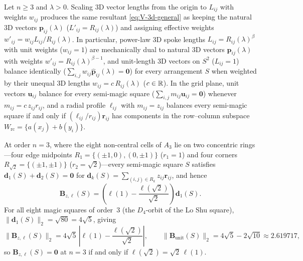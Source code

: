 \begin{proposition}
\label{prop:reciprocity}
Let $n\ge3$ and $\lambda>0$. Scaling 3D vector lengths from the origin to $L_{ij}$ with weights $w_{ij}$ produces the same resultant \eqref{eq:V-3d-general} as keeping the natural 3D vectors $\mathbf p_{ij}(\lambda)$ ($L'_{ij}=R_{ij}(\lambda)$) and assigning effective weights $w'_{ij}=w_{ij}L_{ij}/R_{ij}(\lambda)$. In particular, power-law 3D spoke lengths $L_{ij}=R_{ij}(\lambda)^\beta$ with unit weights ($w_{ij}=1$) are mechanically dual to natural 3D vectors $\mathbf p_{ij}(\lambda)$ with weights $w'_{ij}=R_{ij}(\lambda)^{\beta-1}$, and unit-length 3D vectors on $S^2$ ($L_{ij}=1$) balance identically ($\sum_{i,j}w_{ij}\hat{\mathbf p}_{ij}(\lambda)=\mathbf 0$) for every arrangement $S$ when weighted by their unequal 3D lengths $w_{ij}=c\,R_{ij}(\lambda)$ ($c\in\mathbb{R}$). In the grid plane, unit vectors $\mathbf u_{ij}$ balance for every semi-magic square ($\sum_{i,j}m_{ij}\mathbf u_{ij}=\mathbf 0$) whenever $m_{ij}=c\,z_{ij}r_{ij}$, and a radial profile $\ell_{ij}$ with $m_{ij}=z_{ij}$ balances every semi-magic square if and only if $(\ell_{ij}/r_{ij})\mathbf r_{ij}$ has components in the row--column subspace $W_{\mathrm{rc}}=\{a(x_j)+b(y_i)\}$.

At order $n=3$, where the eight non-central cells of $A_3$ lie on two concentric rings—four edge midpoints $R_1=\{(\pm1,0),(0,\pm1)\}$ ($r_1=1$) and four corners $R_{\sqrt{2}}=\{(\pm1,\pm1)\}$ ($r_2=\sqrt{2}$)—every semi-magic square $S$ satisfies $\mathbf d_1(S)+\mathbf d_2(S)=\mathbf 0$ for $\mathbf d_k(S)=\sum_{(i,j)\in R_k}z_{ij}\mathbf r_{ij}$, and hence
\begin{equation}
\label{eq:n3-radial}
\mathbf B_{z,\ell}(S) = \left(\ell(1) - \frac{\ell(\sqrt{2})}{\sqrt{2}}\right)\mathbf d_1(S).
\end{equation}
For all eight magic squares of order~$3$ (the $D_4$-orbit of the Lo Shu square), $\|\mathbf d_1(S)\|_2=\sqrt{80}=4\sqrt{5}$, giving
\begin{equation}
\label{eq:n3-norm}
\|\mathbf B_{z,\ell}(S)\|_2 = 4\sqrt{5}\,\left|\ell(1) - \frac{\ell(\sqrt{2})}{\sqrt{2}}\right|,
\qquad
\|\mathbf B_{\mathrm{unit}}(S)\|_2 = 4\sqrt{5} - 2\sqrt{10} \approx 2.619717,
\end{equation}
so $\mathbf B_{z,\ell}(S)=\mathbf 0$ at $n=3$ if and only if $\ell(\sqrt{2})=\sqrt{2}\,\ell(1)$.
\end{proposition}

